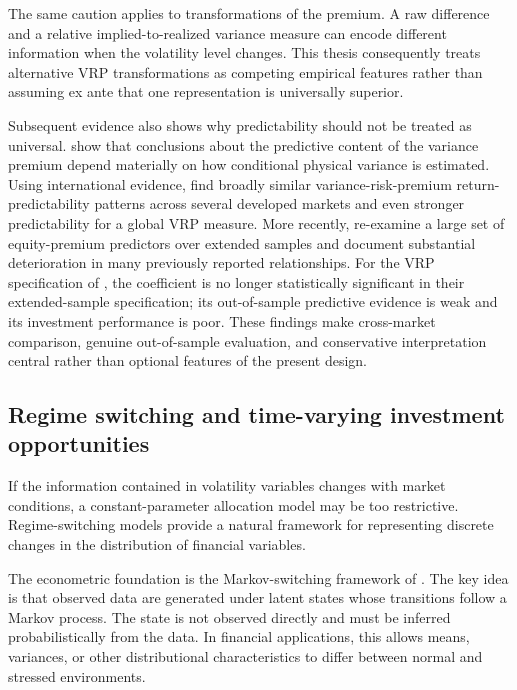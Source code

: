 The same caution applies to transformations of the premium. A raw difference and a relative implied-to-realized variance measure can encode different information when the volatility level changes. This thesis consequently treats alternative VRP transformations as competing empirical features rather than assuming ex ante that one representation is universally superior.

Subsequent evidence also shows why predictability should not be treated as universal. \textcite{BekaertHoerova2014} show that conclusions about the predictive content of the variance premium depend materially on how conditional physical variance is estimated. Using international evidence, \textcite{BollerslevMarroneXuZhou2014} find broadly similar variance-risk-premium return-predictability patterns across several developed markets and even stronger predictability for a global VRP measure. More recently, \textcite{GoyalWelchZafirov2024} re-examine a large set of equity-premium predictors over extended samples and document substantial deterioration in many previously reported relationships. For the VRP specification of \textcite{BollerslevTauchenZhou2009}, the coefficient is no longer statistically significant in their extended-sample specification; its out-of-sample predictive evidence is weak and its investment performance is poor. These findings make cross-market comparison, genuine out-of-sample evaluation, and conservative interpretation central rather than optional features of the present design.

\subsection{Regime switching and time-varying investment opportunities}

If the information contained in volatility variables changes with market conditions, a constant-parameter allocation model may be too restrictive. Regime-switching models provide a natural framework for representing discrete changes in the distribution of financial variables.

The econometric foundation is the Markov-switching framework of \textcite{Hamilton1989}. The key idea is that observed data are generated under latent states whose transitions follow a Markov process. The state is not observed directly and must be inferred probabilistically from the data. In financial applications, this allows means, variances, or other distributional characteristics to differ between normal and stressed environments.

